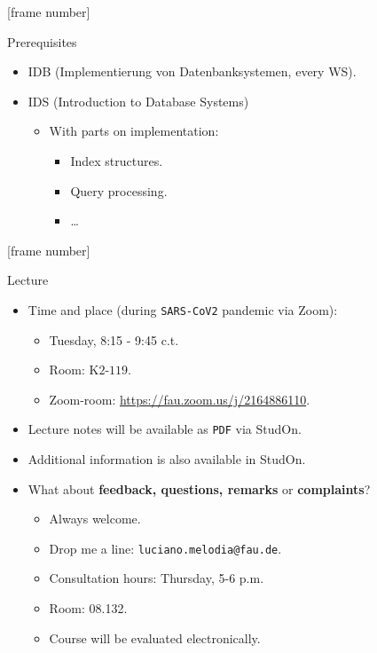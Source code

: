 \documentclass[aspectratio=169,t]{beamer}
\begin{document}
{ %
	[frame number]
	\begin{frame}{Prerequisites}
		\begin{itemize}
			\item IDB (Implementierung von Datenbanksystemen, every WS).
			\item IDS (Introduction to Database Systems)
			      \begin{itemize}
				      \item With parts on implementation:
				            \begin{itemize}
					            \item Index structures.
					            \item Query processing.
					            \item \ldots
				            \end{itemize}
			      \end{itemize}
		\end{itemize}
	\end{frame}
}

{ %
	[frame number]
	\begin{frame}{Lecture}
		\begin{itemize}
			\item Time and place (during \texttt{SARS-CoV2} pandemic via Zoom):
			      \begin{itemize}
				      \item Tuesday, 8:15 - 9:45 c.t.
				      \item Room: K$2$-$119$.
				      \item Zoom-room: \href{https://fau.zoom.us/j/2164886110}{https://fau.zoom.us/j/2164886110}.
			      \end{itemize}
			\item Lecture notes will be available as \texttt{PDF} via StudOn.
			\item Additional information is also available in StudOn.
			\item What about \textbf{feedback, questions, remarks} or \textbf{complaints}?
			      \begin{itemize}
				      \item Always welcome.
				      \item Drop me a line: \texttt{luciano.melodia@fau.de}.
				      \item Consultation hours: Thursday, 5-6 p.m.
				      \item Room: 08.132.
				      \item Course will be evaluated electronically.
			      \end{itemize}
		\end{itemize}
	\end{frame}
}
\end{document}
